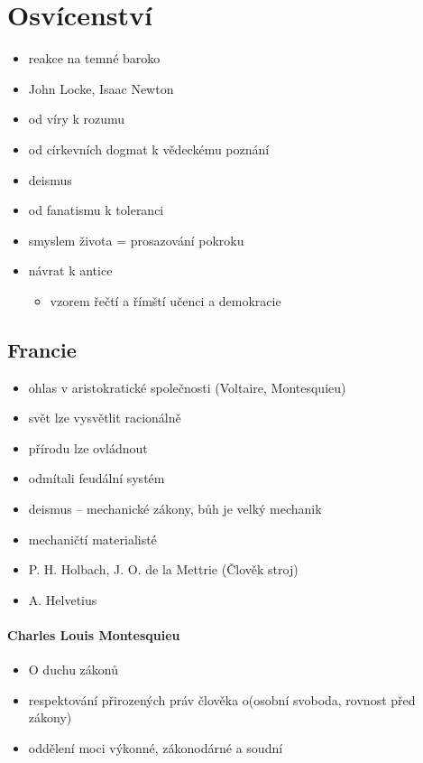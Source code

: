 \section{Osvícenství}
\begin{itemize}
\item reakce na temné baroko 
\item John Locke, Isaac Newton
\item od víry k rozumu
\item od církevních dogmat k vědeckému poznání
\item deismus
\item od fanatismu k toleranci
\item smyslem života = prosazování pokroku
\item návrat k antice
	\begin{itemize}
	\item vzorem řečtí a římští učenci a demokracie
	\end{itemize}
\end{itemize}

\subsection{Francie}
\begin{itemize}
\item ohlas v aristokratické společnosti (Voltaire, Montesquieu)
\item svět lze vysvětlit racionálně
\item přírodu lze ovládnout
\item odmítali feudální systém
\item deismus -- mechanické zákony, bůh je velký mechanik
\item mechaničtí materialisté
\item P. H. Holbach, J. O. de la Mettrie (Člověk stroj)
\item A. Helvetius
\end{itemize}

\paragraph{Charles Louis Montesquieu}
\begin{itemize}
\item O duchu zákonů
\item respektování přirozených práv člověka o(osobní svoboda, rovnost před zákony)
\item oddělení moci výkonné, zákonodárné a soudní
\end{itemize}

